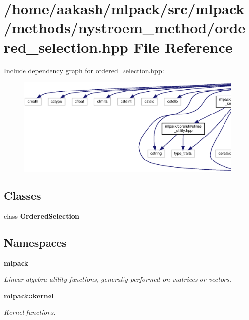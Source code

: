 \section{/home/aakash/mlpack/src/mlpack/methods/nystroem\+\_\+method/ordered\+\_\+selection.hpp File Reference}
\label{ordered__selection_8hpp}
Include dependency graph for ordered\+\_\+selection.\+hpp\+:
\nopagebreak
\begin{figure}[H]
\begin{center}
\leavevmode
\includegraphics[width=350pt]{ordered__selection_8hpp__incl}
\end{center}
\end{figure}
\subsection*{Classes}
\begin{DoxyCompactItemize}
\item 
class \textbf{ Ordered\+Selection}
\end{DoxyCompactItemize}
\subsection*{Namespaces}
\begin{DoxyCompactItemize}
\item 
 \textbf{ mlpack}
\begin{DoxyCompactList}\small\item\em Linear algebra utility functions, generally performed on matrices or vectors. \end{DoxyCompactList}\item 
 \textbf{ mlpack\+::kernel}
\begin{DoxyCompactList}\small\item\em Kernel functions. \end{DoxyCompactList}\end{DoxyCompactItemize}


